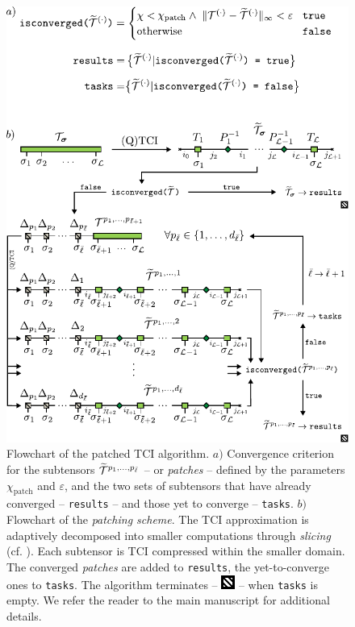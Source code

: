 \begin{figure}[ht!]
	\includegraphics{figures/PatchingAlgorithm.pdf}
	\caption{Flowchart of the patched TCI algorithm. $a)$ Convergence criterion for the subtensors $\widetilde{\mathcal{T}}^{p_1,\dots,p_{\bar \ell}}$ -- or \textit{patches} -- defined by the parameters $\chi_{\text{patch}}$ and $\varepsilon$, and the two sets of subtensors that have already converged -- \texttt{results} -- and those yet to converge  -- \texttt{tasks}. $b)$ Flowchart of the \textit{patching scheme}. The TCI approximation is adaptively decomposed into smaller computations through \textit{slicing} (cf. ). Each subtensor is TCI compressed within the smaller domain. The converged \textit{patches} are added to \texttt{results}, the yet-to-converge ones to \texttt{tasks}. The algorithm terminates -- \includegraphics[scale=0.95]{figures/TerminalSquare.pdf} -- when \texttt{tasks} is empty. We refer the reader to the main manuscript for additional details.}
	\label{fig:patchingAlg}
\end{figure}

